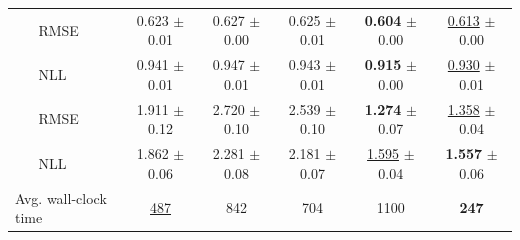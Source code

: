 \begin{table}[t]
\begin{tabular}{llccccc}
\addlinespace[2pt]
\multirow{2}{*}{Winered} & RMSE & 0.623 $\pm$ {\footnotesize 0.01} & 0.627 $\pm$ {\footnotesize 0.00} & 0.625 $\pm$ {\footnotesize 0.01} & \textbf{0.604} $\pm$ {\footnotesize 0.00} & \underline{0.613} $\pm$ {\footnotesize 0.00} \\
 & NLL & 0.941 $\pm$ {\footnotesize 0.01} & 0.947 $\pm$ {\footnotesize 0.01} & 0.943 $\pm$ {\footnotesize 0.01} & \textbf{0.915} $\pm$ {\footnotesize 0.00} & \underline{0.930} $\pm$ {\footnotesize 0.01} \\
\addlinespace[2pt]
\multirow{2}{*}{Yacht} & RMSE & 1.911 $\pm$ {\footnotesize 0.12} & 2.720 $\pm$ {\footnotesize 0.10} & 2.539 $\pm$ {\footnotesize 0.10} & \textbf{1.274} $\pm$ {\footnotesize 0.07} & \underline{1.358} $\pm$ {\footnotesize 0.04} \\
 & NLL & 1.862 $\pm$ {\footnotesize 0.06} & 2.281 $\pm$ {\footnotesize 0.08} & 2.181 $\pm$ {\footnotesize 0.07} & \underline{1.595} $\pm$ {\footnotesize 0.04} & \textbf{1.557} $\pm$ {\footnotesize 0.06} \\
\midrule
\multicolumn{2}{l}{Avg. wall-clock time} & \underline{487} & 842 & 704 & 1100 & \textbf{247} \\
\bottomrule
\end{tabular}
\end{table}
